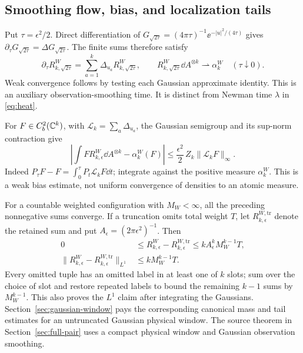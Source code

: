 \subsection{Smoothing flow, bias, and localization tails}

Put $\tau=\epsilon^2/2$. Direct differentiation of
$G_{\sqrt{2\tau}}=(4\pi\tau)^{-1}\ee^{-|u|^2/(4\tau)}$ gives
$\partial_\tau G_{\sqrt{2\tau}}=\Delta G_{\sqrt{2\tau}}$.
The finite sums therefore satisfy
\begin{equation}\label{eq:smoothing-flow}
 \partial_\tau R_{k,\sqrt{2\tau}}^W
    =\sum_{a=1}^k\Delta_{u_a}R_{k,\sqrt{2\tau}}^W,
 \qquad R_{k,\sqrt{2\tau}}^W\dd A^{\otimes k}
      \rightharpoonup\alpha_k^W\quad(\tau\downarrow0).
\end{equation}
Weak convergence follows by testing each Gaussian approximate identity.
This is an auxiliary observation-smoothing time. It is distinct from
Newman time $\lambda$ in \eqref{eq:heat}.

For $F\in C_b^2(\mathbb C^k)$, with $\mathcal L_k=\sum_a\Delta_{u_a}$,
the Gaussian semigroup and its sup-norm contraction give
\begin{equation}\label{eq:smoothing-bias}
 \left|\int F R_{k,\epsilon}^W\dd A^{\otimes k}
                       -\alpha_k^W(F)\right|
 \le\frac{\epsilon^2}{2}\,Z_k\|\mathcal L_kF\|_\infty.
\end{equation}
Indeed $P_\tau F-F=\int_0^\tau P_t\mathcal L_kF\dd t$; integrate
against the positive measure $\alpha_k^W$. This is a weak bias estimate,
not uniform convergence of densities to an atomic measure.

For a countable weighted configuration with $M_W<\infty$, all the
preceding nonnegative sums converge. If a truncation omits total weight
$T$, let $R_{k,\epsilon}^{W,\mathrm{tr}}$ denote the retained sum and put
$A_\epsilon=(2\pi\epsilon^2)^{-1}$. Then
\begin{equation}\label{eq:spatial-tail}
 \begin{split}
 0&\le R_{k,\epsilon}^W-R_{k,\epsilon}^{W,\mathrm{tr}}
          \le k A_\epsilon^kM_W^{k-1}T,\\
 \|R_{k,\epsilon}^W-R_{k,\epsilon}^{W,\mathrm{tr}}\|_{L^1}
          &\le kM_W^{k-1}T.
 \end{split}
\end{equation}
Every omitted tuple has an omitted label in at least one of $k$ slots;
sum over the choice of slot and restore repeated labels to bound the
remaining $k-1$ sums by $M_W^{k-1}$. This also proves the $L^1$ claim
after integrating the Gaussians. Section~\ref{sec:gaussian-window}
pays the corresponding canonical mass and tail estimates for an
untruncated Gaussian physical window. The source theorem in
Section~\ref{sec:full-pair} uses a compact physical window and Gaussian
observation smoothing.

